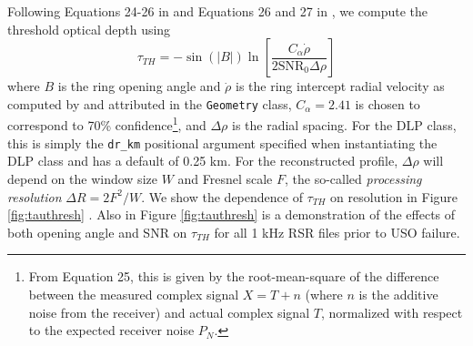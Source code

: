 \documentclass[titlepage, 12pt]{article}
\begin{document}
                Following Equations 24-26 in \citet{Marouf1986} and Equations 26
                and 27 in \citet{CRSUG2018}, we compute the threshold optical
                depth using
                \begin{equation}
                    \tau_{TH}=-\sin(|B|)
                    \ln\left[\frac{C_\alpha\dot{\rho}}
                                  {2\mathrm{SNR}_0\Delta\rho}\right]
                \end{equation}
                where $B$ is the ring opening angle and $\dot{\rho}$ is the ring
                intercept radial velocity as computed by and attributed in the
                \texttt{Geometry} class, $C_\alpha=2.41$ is chosen to correspond
                to 70\% confidence\footnote{From \citet{Marouf1986} Equation 25,
                this is given by the root-mean-square of the difference between
                the measured complex signal $X=T+n$ (where $n$ is the additive
                noise from the receiver) and actual complex signal $T$, normalized
                with respect to the expected receiver noise $P_N$.}, and
                $\Delta\rho$ is the radial spacing. For the DLP class, this is
                simply the \texttt{dr\_km} positional argument specified when
                instantiating the DLP class and has a default of 0.25 km. For the
                reconstructed profile, $\Delta\rho$ will depend on the window size
                $W$ and Fresnel scale $F$, the so-called
                \textit{processing resolution} $\Delta R=2F^2/W$. We show the
                dependence of $\tau_{TH}$ on resolution in Figure \ref{fig:tauthresh}
                \citep[cf. Fig. 8,][]{Marouf1986}. Also in Figure \ref{fig:tauthresh} is a demonstration of the effects of both opening angle and SNR on $\tau_{TH}$ for all 1 kHz RSR files prior to USO failure.
\end{document}
